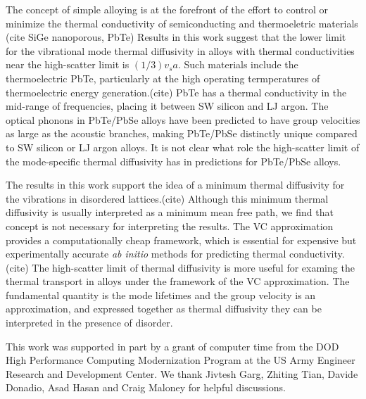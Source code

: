 \documentclass[aps,prb,twocolumn,superscriptaddress,amsmath,amssymb,floatfix]{revtex4}
\begin{document}
The concept of simple alloying is at the forefront of the effort 
to control or minimize the thermal conductivity of semiconducting and 
thermoeletric materials (cite SiGe nanoporous, PbTe) 
Results in this work suggest that the lower limit for the vibrational 
mode thermal diffusivity in alloys with thermal conductivities near the 
high-scatter limit is $(1/3)v_sa$. 
Such materials include the thermoelectric PbTe,
particularly at the high operating termperatures of thermoelectric 
energy generation.(cite) PbTe has a thermal conductivity in the 
mid-range of frequencies, placing it between SW silicon and 
LJ argon. The optical phonons in PbTe/PbSe alloys have been 
predicted to have group velocities 
as large as the acoustic branches, 
making PbTe/PbSe distinctly unique compared 
to SW silicon or LJ argon alloys.
\cite{tian_phonon_2012} 
It is not clear what role the high-scatter limit of the mode-specific 
thermal diffusivity has in predictions for PbTe/PbSe alloys. 

The results in this work support the idea of a minimum thermal diffusivity 
for the vibrations in disordered lattices.(cite) 
Although this minimum thermal 
diffusivity is usually interpreted as a minimum mean free path, we find 
that concept is not necessary for interpreting the results. The VC 
approximation provides a computationally cheap framework, which is 
essential for expensive but experimentally accurate \emph{ab initio} 
methods for predicting thermal conductivity.(cite) 
The high-scatter limit 
of thermal diffusivity is more useful for examing the thermal transport 
in alloys under the framework of the VC approximation. The 
fundamental quantity is the mode lifetimes and the group velocity 
is an approximation, and expressed together as thermal diffusivity 
they can be interpreted in the presence of disorder.

\begin{acknowledgements}
This work was supported in part by a grant of computer time from the DOD 
High Performance Computing Modernization Program at the US Army Engineer 
Research and Development Center. 
We thank Jivtesh Garg, Zhiting Tian, Davide Donadio, 
Asad Hasan and Craig Maloney for helpful discussions.
\end{acknowledgements}

\appendix

\end{document}
